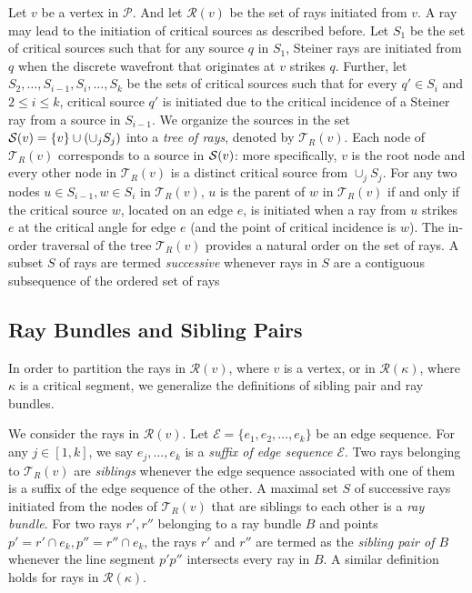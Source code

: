 \documentclass[11pt]{article}
\def\calP{\mathcal{P}}
\def\calT{\mathcal{T}}
\def\calE{\mathcal{E}}
\def\calR{\mathcal{R}}
\begin{document}
Let $v$ be a vertex in $\calP$. And let $\calR(v)$ be the set of rays initiated from $v$. 
A ray may lead to the initiation of critical sources as described before.
Let $S_1$ be the set of critical sources such that for any source $q$ in $S_1$, Steiner rays are initiated from $q$ when the discrete wavefront that  originates at $v$ strikes $q$.
Further, let $S_2, \ldots, S_{i-1}, S_i, \ldots, S_k$ be the sets of critical sources such that for every $q' \in S_i$ and $2 \le i \le k$, critical source $q'$ is initiated due to the critical incidence of a Steiner ray from a source in $S_{i-1}$.
We organize the sources in the set ${\cal S} (v) =\{v\} \cup (\cup_j S_j)$ into a {\it tree of rays}, denoted by $\calT_R(v)$.
Each node of $\calT_R(v)$ corresponds to a source in ${\cal S}(v)$:
more specifically, $v$ is the root node and every other node in $\calT_R(v)$ is a distinct critical source from $\cup_j S_j$. 
For any two nodes $u \in S_{i-1}, w \in S_i$ in $\calT_R(v)$, $u$ is the parent of $w$ in $\calT_R(v)$ if and only if the critical source $w $, located on an edge $e$, is initiated when a ray from $u$ strikes $e$ at the critical angle for edge $e$ (and the point of critical incidence is $w$). 
The in-order traversal of the tree $\calT_R(v)$ provides a natural order on the set of rays. 
A subset $S$ of rays are termed {\it successive} whenever rays in $S$ are a contiguous subsequence of the ordered set of rays

\subsection{Ray Bundles and Sibling Pairs}
In order to partition the rays in
$\calR(v)$, where $v$ is  a vertex, or in $\calR(\kappa)$, where $\kappa$ is a critical segment,
we generalize the definitions of  sibling pair and ray bundles.

We consider the rays in $\calR(v)$. 
Let ${\calE} = \{e_1, e_2, \ldots, e_k\}$ be an edge sequence.
For any $j \in [1, k]$, we say $e_j, \ldots, e_k$ is a {\it suffix of edge sequence $\calE$}. 
Two rays belonging to $\calT_{R}(v)$ are {\it siblings} whenever the edge sequence associated with one of them is a suffix of the edge sequence of the other. 
A maximal set $S$ of successive rays initiated from the nodes of $\calT_{R}(v)$ that are siblings to each other is a {\it ray bundle}.
For two rays $r', r''$ belonging to a ray bundle $B$ and points $p' = r' \cap e_k, p'' = r'' \cap e_k$, the rays $r'$ and $r''$ are termed as the {\it sibling pair of $B$} whenever the line segment $p'p''$ intersects every ray in $B$.
A similar definition holds for rays in $\calR(\kappa)$.
 
\end{document}
